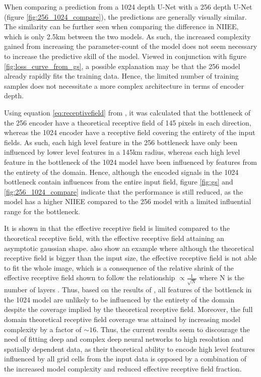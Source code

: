 \documentclass[../main/thesis]{subfiles}
\begin{document}
When comparing a prediction from a 1024 depth U-Net with a 256 depth U-Net (figure \ref{fig:256_1024_compare}), the predictions are generally visually similar. The similarity can be further seen when comparing the difference in NIIEE, which is only 2.5km between the two models. As such, the increased complexity gained from increasing the parameter-count of the model does not seem necessary to increase the predictive skill of the model. Viewed in conjunction with figure \ref{fig:loss_curve_from_gs}, a possible explanation may be that the 256 model already rapidly fits the training data. Hence, the limited number of training samples does not necessitate a more complex architecture in terms of encoder depth.

Using equation \ref{eq:receptivefield} from \citet{Araujo2019}, it was calculated that the bottleneck of the 256 encoder have a theoretical receptive field of 145 pixels in each direction, whereas the 1024 encoder have a receptive field covering the entirety of the input fields. As such, each high level feature in the 256 bottleneck have only been influenced by lower level features in a 145km radius, whereas each high level feature in the bottleneck of the 1024 model have been influenced by features from the entirety of the domain. Hence, although the encoded signals in the 1024 bottleneck contain influences from the entire input field, figure \ref{fig:gs} and \ref{fig:256_1024_compare} indicate that the performance is still reduced, as the model has a higher NIIEE compared to the 256 model with a limited influential range for the bottleneck. 

It is shown in \citet{Luo2017} that the effective receptive field is limited compared to the theoretical receptive field, with the effective receptive field attaining an asymptotic gaussian shape. \citet{Luo2017} also show an example where although the theoretical receptive field is bigger than the input size, the effective receptive field is not able to fit the whole image, which is a consequence of the relative shrink of the effective receptive field shown to follow the relationship $\propto \frac{1}{\sqrt{N}}$ where N is the number of layers \citep{Luo2017}. Thus, based on the results of \citet{Luo2017}, all features of the bottlenck in the 1024 model are unlikely to be influenced by the entirety of the domain despite the coverage implied by the theoretical receptive field. Moreover, the full domain theoretical receptive field coverage was attained by increasing model complexity by a factor of $\sim 16$. Thus, the current results seem to discourage the need of fitting deep and complex deep neural networks to high resolution and spatially dependent data, as their theoretical ability to encode high level features influenced by all grid cells from the input data is opposed by a combination of the increased model complexity and reduced effective receptive field fraction.
\end{document}
